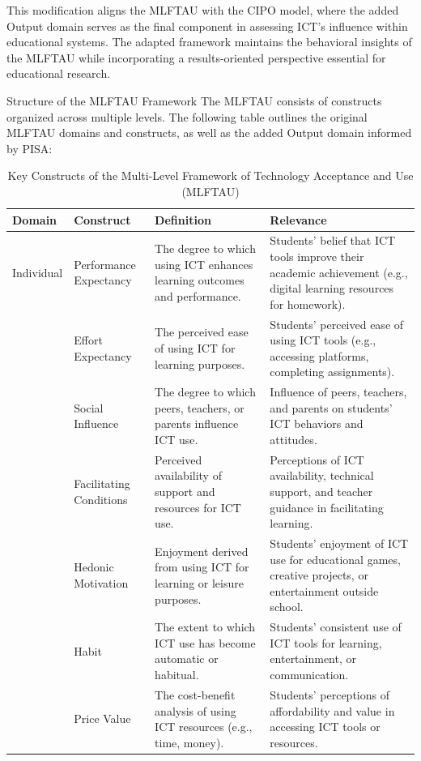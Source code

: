 \documentclass[
]{article}
\begin{document}
This modification aligns the MLFTAU with the CIPO model, where the added
Output domain serves as the final component in assessing ICT's influence
within educational systems. The adapted framework maintains the
behavioral insights of the MLFTAU while incorporating a results-oriented
perspective essential for educational research.

Structure of the MLFTAU Framework The MLFTAU consists of constructs
organized across multiple levels. The following table outlines the
original MLFTAU domains and constructs, as well as the added Output
domain informed by PISA:

\begin{longtable}[t]{>{\raggedright\arraybackslash}p{2cm}>{\raggedright\arraybackslash}p{3cm}>{\raggedright\arraybackslash}p{5cm}>{\raggedright\arraybackslash}p{5cm}}
\caption{\label{tab:MLFTAU_constructs}Key Constructs of the Multi-Level Framework of Technology Acceptance and Use (MLFTAU)}\\
\toprule
Domain & Construct & Definition & Relevance\\
\midrule
Individual & Performance Expectancy & The degree to which using ICT enhances learning outcomes and performance. & Students' belief that ICT tools improve their academic achievement (e.g., digital learning resources for homework).\\
 & Effort Expectancy & The perceived ease of using ICT for learning purposes. & Students' perceived ease of using ICT tools (e.g., accessing platforms, completing assignments).\\
 & Social Influence & The degree to which peers, teachers, or parents influence ICT use. & Influence of peers, teachers, and parents on students' ICT behaviors and attitudes.\\
 & Facilitating Conditions & Perceived availability of support and resources for ICT use. & Perceptions of ICT availability, technical support, and teacher guidance in facilitating learning.\\
 & Hedonic Motivation & Enjoyment derived from using ICT for learning or leisure purposes. & Students' enjoyment of ICT use for educational games, creative projects, or entertainment outside school.\\
\addlinespace
 & Habit & The extent to which ICT use has become automatic or habitual. & Students' consistent use of ICT tools for learning, entertainment, or communication.\\
 & Price Value & The cost-benefit analysis of using ICT resources (e.g., time, money). & Students' perceptions of affordability and value in accessing ICT tools or resources.\\

\end{longtable}
\end{document}
